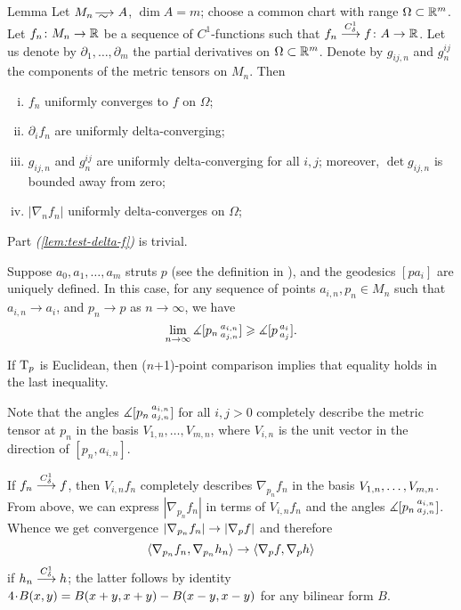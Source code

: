 \begin{thm}{Lemma}\label{lem:test-delta}
Let $M_n\smooths{} A$, $\dim A=m$;
choose a common chart with range $\Omega\subset \mathbb{R}^m$.
Let $f_n\colon M_n\to\mathbb{R}$ be a sequence of $C^1$-functions such that $f_n\zz\smoothto f\:A\to \RR$.
Let us denote by $\partial_1,\dots,\partial_m$ the partial derivatives on $\Omega\subset \mathbb{R}^m$.
Denote by $g_{ij,n}$ and $g^{ij}_n$ the components of the metric tensors on $M_n$.
Then 
\begin{enumerate}[(i)]
\item\label{lem:test-delta-f} $f_n$ uniformly converges to $f$ on $\Omega$;
\item\label{lem:test-delta-partial} $\partial_if_n$ are uniformly delta-converging;
\item\label{lem:test-delta-g}  $g_{ij,n}$ and $g^{ij}_n$ are uniformly delta-converging for all $i,j$;
moreover, $\det g_{ij,n}$ is bounded away from zero;
\item\label{lem:test-delta|nabla|} $|\nabla_n f_n|$ uniformly delta-converges on $\Omega$; %
\end{enumerate}

\end{thm}

Part \textit{(\ref{lem:test-delta-f})} is trivial.

Suppose $a_0, a_1,\dots,a_m$ struts $p$ (see the definition in \cite{AKP}), and the geodesics $[pa_i]$ are uniquely defined.
In this case, for any sequence of points $a_{i,n}, p_n\in M_n$ such that $a_{i,n}\to a_i$, and $p_n\to p$ as $n\to\infty$, we have
\[\lim_{n\to\infty}\measuredangle [p_n\,{}^{a_{i,n}}_{a_{j,n}}]\geqslant \measuredangle [p\,{}^{a_i}_{a_j}].\]

If $\mathrm{T}_p$ is Euclidean, then ($n$+1)-point comparison implies that equality holds in the last inequality.

Note that the angles $\measuredangle [p_n\,{}^{a_{i,n}}_{a_{j,n}}]$ for all $i,j>0$ completely describe the metric tensor at $p_n$ in the basis $V_{1,n},\dots,V_{m,n}$, where $V_{i,n}$ is the unit vector in the direction of $[p_n,a_{i,n}]$.

If $f_n\zz\smoothto f$, then $V_{i,n}f_n$ completely describes $\nabla_{p_n}f_n$ in the basis $V_{1,n},\zz\dots,V_{m,n}$.
From above, we can express $|\nabla_{p_n}f_n|$ in terms of $V_{i,n}f_n$ and the angles $\measuredangle [p_n\,{}^{a_{i,n}}_{a_{j,n}}]$.
Whence we get convergence $|\nabla_{p_n} f_n|\zz\to |\nabla_{p} f|$ and therefore 
\[\langle \nabla_{p_n} f_n,\nabla_{p_n} h_n\rangle\zz\to \langle \nabla_p f,\nabla_p h\rangle\] if $h_n\stackrel{C^1_\delta}{\longrightarrow} h$; the latter follows by identity $4\cdot B(x,y)\zz=B(x\zz+y,x\zz+y)\zz-B(x\zz-y,x\zz-y)$ for any bilinear form $B$.

